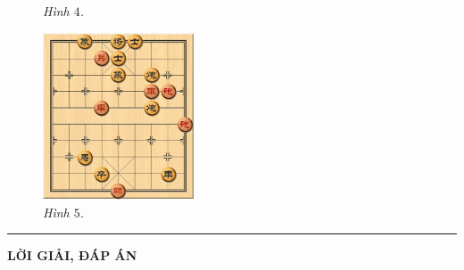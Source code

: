 \begin{multicols}{2}
\begin{figure}[H]
		\caption{\small\textit{\color{gocco}Hình $4$.}}
		\vspace*{-10pt}
	\end{figure}
	\begin{figure}[H]
		\vspace*{5pt}
		\centering
		\captionsetup{labelformat= empty, justification=centering}
		\includegraphics[width= 0.4\textwidth]{5}
		\caption{\small\textit{\color{gocco}Hình $5$.}}
		\vspace*{-10pt}
	\end{figure}
\end{multicols}
\vspace*{-10pt}
\rule{1\linewidth}{0.1pt}
\begin{center}
	\vspace*{-5pt}
	\LARGE{\textbf{\color{gocco}LỜI GIẢI, ĐÁP ÁN}}
	\vspace*{-5pt}
\end{center}
